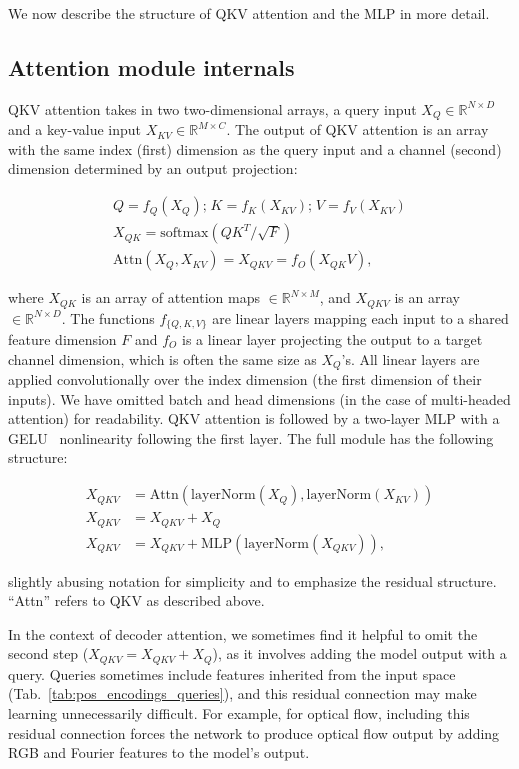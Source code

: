 \documentclass{article} %
\begin{document}
We now describe the structure of QKV attention and the MLP in more detail.

\subsection{Attention module internals}

QKV attention takes in two two-dimensional arrays, a query input $X_{Q} \in \mathbb{R}^{N \times D}$ and a key-value input $X_{KV} \in \mathbb{R}^{M \times C}$. The output of QKV attention is an array with the same index (first) dimension as the query input and a channel (second) dimension determined by an output projection:

\begin{align}
    Q = f_{Q}(X_Q) \text{;} \; K = f_K(X_{KV})  \text{;} \; V = f_V(X_{KV}) \\
    X_{QK} = \text{softmax}(QK^T / \sqrt{F}) \\
    \text{Attn}(X_Q, X_{KV}) = X_{QKV} = f_{O}({X_{QK}V}),
\end{align}

where $X_{QK}$ is an array of attention maps $\in \mathbb{R}^{N \times M}$, and $X_{QKV}$ is an array $\in \mathbb{R}^{N \times D}$. The functions $f_{\{Q, K, V\}}$ are linear layers mapping each input to a shared feature dimension $F$ and $f_O$ is a linear layer projecting the output to a target channel dimension, which is often the same size as $X_{Q}$'s. All linear layers are applied convolutionally over the index dimension (the first dimension of their inputs). We have omitted batch and head dimensions (in the case of multi-headed attention) for readability. 
QKV attention is followed by a two-layer MLP with a GELU~\citep{hendrycks2016gelu} nonlinearity following the first layer. The full module has the following structure:

\begin{align}
    X_{QKV} &= \text{Attn}(\text{layerNorm}(X_Q), \text{layerNorm}(X_{KV})) \\
    X_{QKV} &= X_{QKV} + X_Q \\
    X_{QKV} &= X_{QKV} + \text{MLP}(\text{layerNorm}(X_{QKV})),
\end{align}

slightly abusing notation for simplicity and to emphasize the residual structure. ``Attn'' refers to QKV as described above. 

In the context of decoder attention, we sometimes find it helpful to omit the second step ($X_{QKV} = X_{QKV} + X_Q$), as it involves adding the model output with a query. Queries sometimes include features inherited from the input space (Tab.~\ref{tab:pos_encodings_queries}), and this residual connection may make learning unnecessarily difficult. For example, for optical flow, including this residual connection forces the network to produce optical flow output by adding RGB and Fourier features to the model's output.
\end{document}
